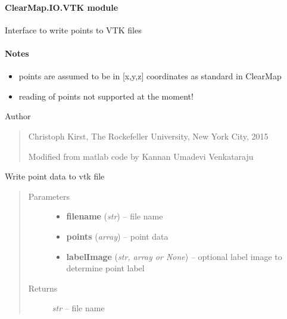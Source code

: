 \documentclass[letterpaper,10pt,english]{sphinxmanual}
\begin{document}
\paragraph{ClearMap.IO.VTK module}
\label{api/ClearMap.IO:module-ClearMap.IO.VTK}\label{api/ClearMap.IO:clearmap-io-vtk-module}
Interface to write points to VTK files
\paragraph{Notes}
\begin{itemize}
\item {} 
points are assumed to be in {[}x,y,z{]} coordinates as standard in ClearMap

\item {} 
reading of points not supported at the moment!

\end{itemize}

Author
\begin{quote}

Christoph Kirst, The Rockefeller University, New York City, 2015

Modified from matlab code by Kannan Umadevi Venkataraju
\end{quote}

\begin{fulllineitems}
\label{api/ClearMap.IO:ClearMap.IO.VTK.writePoints}
Write point data to vtk file
\begin{quote}\begin{description}
\item[{Parameters}] \leavevmode\begin{itemize}
\item {} 
\textbf{filename} (\emph{str}) --
file name

\item {} 
\textbf{points} (\emph{array}) --
point data

\item {} 
\textbf{labelImage} (\emph{str, array or None}) --
optional label image to determine point label

\end{itemize}

\item[{Returns}] \leavevmode
\emph{str} --
file name

\end{description}\end{quote}

\end{fulllineitems}
\end{document}
